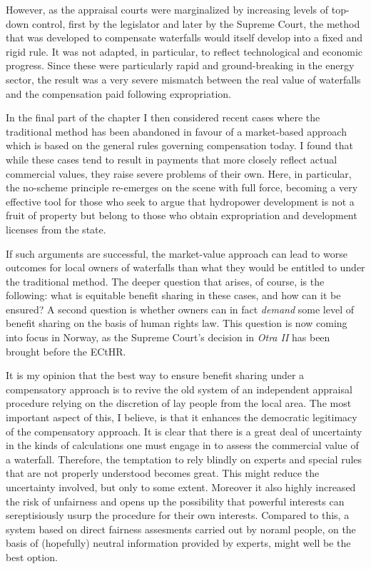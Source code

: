 However, as the appraisal courts were marginalized by increasing levels of top-down control, first by the legislator and later by the Supreme Court, the method that was developed to compensate waterfalls would itself develop into a fixed and rigid rule. It was not adapted, in particular, to reflect technological and economic progress. Since these were particularly rapid and ground-breaking in the energy sector, the result was a very severe mismatch between the real value of waterfalls and the compensation paid following expropriation. 

In the final part of the chapter I then considered recent cases where the traditional method has been abandoned in favour of a market-based approach which is based on the general rules governing compensation today. I found that while these cases tend to result in payments that more closely reflect actual commercial values, they raise severe problems of their own. Here, in particular, the no-scheme principle re-emerges on the scene with full force, becoming a very effective tool for those who seek to argue that hydropower development is not a fruit of property but belong to those who obtain expropriation and development licenses from the state. 

If such arguments are successful, the market-value approach can lead to worse outcomes for local owners of waterfalls than what they would be entitled to under the traditional method. The deeper question that arises, of course, is the following: what is equitable benefit sharing in these cases, and how can it be ensured? A second question is whether owners can in fact {\it demand} some level of benefit sharing on the basis of human rights law. This question is now coming into focus in Norway, as the Supreme Court's decision in {\it Otra II} has been brought before the ECtHR.
 
It is my opinion that the best way to ensure benefit sharing under a compensatory approach is to revive the old system of an independent appraisal procedure relying on the discretion of lay people from the local area. The most important aspect of this, I believe, is that it enhances the democratic legitimacy of the compensatory approach. It is clear that there is a great deal of uncertainty in the kinds of calculations one must engage in to assess the commercial value of a waterfall. Therefore, the temptation to rely blindly on experts and special rules that are not properly understood becomes great. This might reduce the uncertainty involved, but only to some extent. Moreover it also highly increased the risk of unfairness and opens up the possibility that powerful interests can sereptisiously usurp the procedure for their own interests. Compared to this, a system based on direct fairness assesments carried out by noraml people, on the basis of (hopefully) neutral information provided by experts, might well be the best option.

